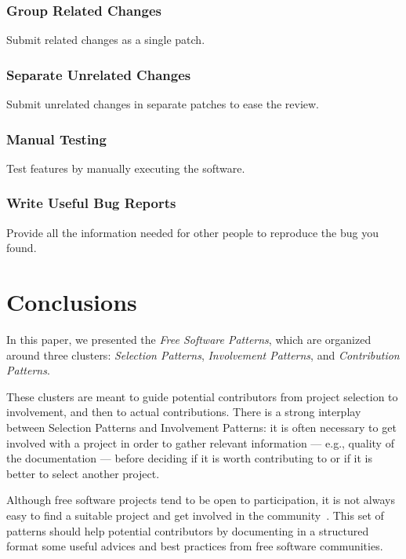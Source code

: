 \documentclass[12pt]{article}
\begin{document}
\subsubsection{Group Related Changes} \label{contribution/GroupRelatedChanges} 
    Submit related changes as a single patch.
\subsubsection{Separate Unrelated Changes} \label{contribution/SeparateUnrelatedChanges} 
    Submit unrelated changes in separate patches to ease the review.
\subsubsection{Manual Testing} \label{contribution/ManualTesting}
    Test features by manually executing the software.
\subsubsection{Write Useful Bug Reports} \label{contribution/WriteUsefulBugReports}
    Provide all the information needed for other people to reproduce the bug you found.
   

\section{Conclusions}

In this paper, we presented the \textit{Free Software Patterns}, which are organized
around three clusters: \textit{Selection Patterns}, \textit{Involvement Patterns}, and
\textit{Contribution Patterns}.

These clusters are meant to guide potential contributors
from project selection to involvement, and then to actual contributions. 
There is a strong interplay between Selection Patterns and Involvement Patterns: it
is often necessary to get involved with a project in order to gather relevant
information --- e.g., quality of the documentation --- before deciding if it is
worth contributing to or if it is better to select another project.

Although free software projects tend to be open to participation, it is not
always easy to find a suitable project and get involved in the community~\cite{lester2012}. 
This set of patterns should help potential contributors by documenting in a
structured format some useful advices and best practices from free software
communities. 

\end{document}
